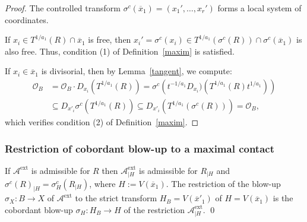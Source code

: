 \documentclass{amsart}
\newcommand{\cA}{{\mathcal A}}
\renewcommand{\cD}{{\mathcal D}}
\newcommand{\cI}{{\mathcal I}}
\newcommand{\cO}{{\mathcal O}}
\newcommand{\ext}{{\operatorname{ext}}}
\begin{document}
\begin{proof}
The controlled transform $\sigma^c(\overline{x}_1) = (x_1', \ldots, x_r')$ forms a local system of coordinates. 

If $x_i \in T^{1/a_1}(R) \cap \overline{x}_1$ is free, then $x_i' = \sigma^c(x_i) \in T^{1/a_1}(\sigma^c(R)) \cap \sigma^c(\overline{x}_1)$ is also free. Thus, condition (1) of Definition~\ref{maxim} is satisfied.

If $x_i \in \overline{x}_1$ is divisorial, then by Lemma~\ref{tangent}, we compute:
\begin{align*}
\mathcal{O}_B &= \mathcal{O}_B \cdot D_{x_i}(T^{1/a_1}(R))
= \sigma^c\left( {t^{-1/a_1}}D_{x_i})(T^{1/a_1}(R) t^{1/a_1})\right) \\
&\subseteq  D_{x'_i}\sigma^c(T^{1/a_1}(R))\subseteq  D_{x'_i}(T^{1/a_1}(\sigma^c(R)))=\cO_B,
\end{align*}
which verifies condition (2) of Definition~\ref{maxim}.
\end{proof}



\subsubsection{Restriction of cobordant blow-up to a maximal contact}
\begin{lemma} \cite{ATW-weighted} \label{rest} If $\cA^{\ext}$ is admissible for $R$ then $\cA^{\ext}_{|H}$ is admissible for $R_{|H}$ and $\sigma^c(R)_{|H}=\sigma_H^c(R_{|H})$, where $H:=V(\overline{x}_1)$. 
The restriction of the blow-up  $\sigma_X: B\to X$ of $\cA^{\ext}$ to the strict transform $H_B=V(\overline{x}'_1)$ of $H=V(\overline{x}_1)$ is the cobordant blow-up  $\sigma_H: H_B\to H$ of the restriction  $\cA^{\ext}_{|H}$. \qed
	
\end{lemma}
\end{document}
